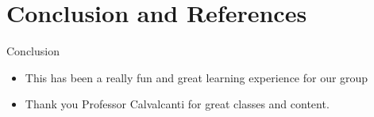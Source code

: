 \section{Conclusion and References}
    
    \frame{\sectionpage}
    
    \begin{frame}{Conclusion}
         	\begin{itemize}
         	\item This has been a really fun and great learning experience for our group
         	\pause
         	\item Thank you Professor Calvalcanti for great classes and content.
         	\pause
         \end{itemize}
    \end{frame}